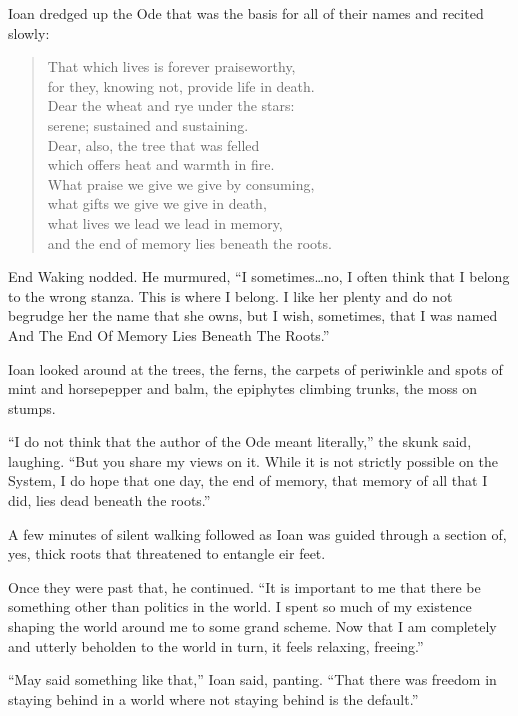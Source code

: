 Ioan dredged up the Ode that was the basis for all of their names and recited slowly:

\begin{quote}
That which lives is forever praiseworthy,\\
for they, knowing not, provide life in death.\\
Dear the wheat and rye under the stars:\\
serene; sustained and sustaining.\\
Dear, also, the tree that was felled\\
which offers heat and warmth in fire.\\
What praise we give we give by consuming,\\
what gifts we give we give in death,\\
what lives we lead we lead in memory,\\
and the end of memory lies beneath the roots.
\end{quote}

End Waking nodded. He murmured, ``I sometimes\ldots no, I often think that I belong to the wrong stanza. This is where I belong. I like her plenty and do not begrudge her the name that she owns, but I wish, sometimes, that I was named And The End Of Memory Lies Beneath The Roots.''

Ioan looked around at the trees, the ferns, the carpets of periwinkle and spots of mint and horsepepper and balm, the epiphytes climbing trunks, the moss on stumps.

``I do not think that the author of the Ode meant literally,'' the skunk said, laughing. ``But you share my views on it. While it is not strictly possible on the System, I do hope that one day, the end of memory, that memory of all that I did, lies dead beneath the roots.''

A few minutes of silent walking followed as Ioan was guided through a section of, yes, thick roots that threatened to entangle eir feet.

Once they were past that, he continued. ``It is important to me that there be something other than politics in the world. I spent so much of my existence shaping the world around me to some grand scheme. Now that I am completely and utterly beholden to the world in turn, it feels relaxing, freeing.''

``May said something like that,'' Ioan said, panting. ``That there was freedom in staying behind in a world where not staying behind is the default.''

